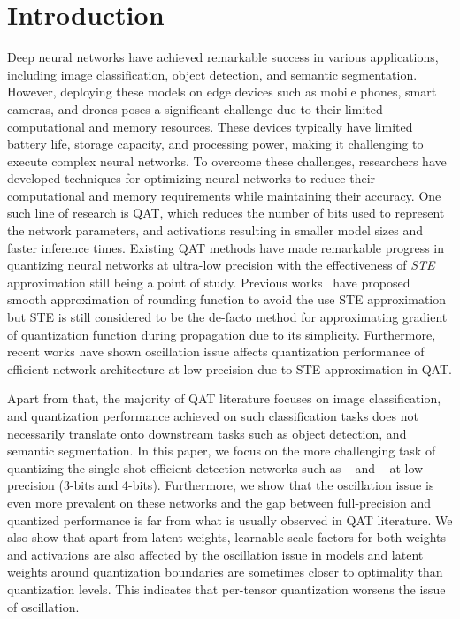 \section{Introduction}
Deep neural networks have achieved remarkable success in various applications, including image classification, object detection, and semantic segmentation. However, deploying these models on edge devices such as mobile phones, smart cameras, and drones poses a significant challenge due to their limited computational and memory resources. These devices typically have limited battery life, storage capacity, and processing power, making it challenging to execute complex neural networks.
To overcome these challenges, researchers have developed techniques for optimizing neural networks to reduce their computational and memory requirements while maintaining their accuracy. One such line of research is \gls{QAT}, which reduces the number of bits used to represent the network parameters, and activations resulting in smaller model sizes and faster inference times. Existing \acrshort{QAT} \cite{lsq, liu2022nonuniform, nagel2021white, krishnamoorthi} methods have made remarkable progress in quantizing neural networks at ultra-low precision with the effectiveness of {\em \acrfull{STE}} approximation still being a point of study. Previous works~\cite{Gong2019DSQ, quantization_nets} have proposed smooth approximation of rounding function to avoid the use \acrshort{STE} approximation but \acrshort{STE} is still considered to be the de-facto method for approximating gradient of quantization function during propagation due to its simplicity. Furthermore, recent works \cite{nagel2022overcoming, defossez2022differentiable} have shown oscillation issue affects quantization performance of efficient network architecture at low-precision due to \acrshort{STE} approximation in \acrshort{QAT}. 

Apart from that, the majority of \acrshort{QAT} literature focuses on image classification, and quantization performance achieved on such classification tasks does not necessarily translate onto downstream tasks such as object detection, and semantic segmentation. In this paper, we focus on the more challenging task of quantizing the single-shot efficient detection networks such as \yoloa{}~\cite{yolov5} and \yolob{}~\cite{wang2022yolov7} at low-precision (3-bits and 4-bits). Furthermore, we show that the oscillation issue is even more prevalent on these networks and the gap between full-precision and quantized performance is far from what is usually observed in \acrshort{QAT} literature. We also show that apart from latent weights, learnable scale factors for both weights and activations are also affected by the oscillation issue in \yolo{} models and latent weights around quantization boundaries are sometimes closer to optimality than quantization levels. This indicates that per-tensor quantization worsens the issue of oscillation.

